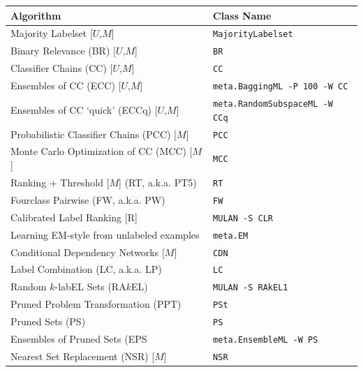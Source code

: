 \documentclass[11pt]{article}
\begin{document}
{
{\par \vspace{2mm}}
\begin{tabular}{ll}
	\hline
	\textbf{Algorithm}               & \textbf{Class Name} \\
	\hline
	Majority Labelset [$U$,$M$] & \texttt{MajorityLabelset} \\
	\hline
	Binary Relevance (BR) [$U$,$M$] & \texttt{BR} \\
	Classifier Chains (CC) [$U$,$M$] & \texttt{CC} \\
	Ensembles of CC (ECC)  [$U$,$M$] & \texttt{meta.BaggingML -P 100 -W CC} \\
	Ensembles of CC `quick' (ECCq) [$U$,$M$] & \texttt{meta.RandomSubspaceML -W CCq} \\
	Probabilistic Classifier Chains (PCC) [$M$] & \texttt{PCC} \\
	Monte Carlo Optimization of CC (MCC) [$M$] & \texttt{MCC} \\
	\hline
	Ranking + Threshold [$M$] (RT, a.k.a. PT5)  & \texttt{RT} \\
	\hline
	Fourclass Pairwise (FW, a.k.a. PW)  & \texttt{FW} \\
	Calibrated Label Ranking [R] & \texttt{MULAN -S CLR} \\ 
	\hline
	Learning EM-style from unlabeled examples  & \texttt{meta.EM} \\ 
	\hline
	Conditional Dependency Networks [$M$] & \texttt{CDN} \\ 
	\hline
	Label Combination (LC, a.k.a. LP) & \texttt{LC} \\ 
	Random $k$-labEL Sets (RA$k$EL) & \texttt{MULAN -S RAkEL1} \\ 
	Pruned Problem Transformation (PPT)  & \texttt{PSt} \\
	Pruned Sets (PS)               & \texttt{PS} \\
	Ensembles of Pruned Sets (EPS  & \texttt{meta.EnsembleML -W PS} \\
	Nearest Set Replacement (NSR) [$M$]  & \texttt{NSR} \\
	\hline
\end{tabular}
}


\end{document}
